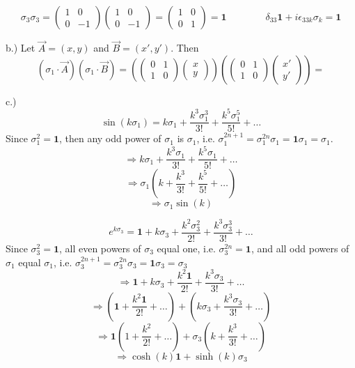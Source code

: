 \documentclass[12pt]{article}
\begin{document}
$$\sigma_3 \sigma_3 = \begin{pmatrix} 1 & 0 \\ 0 & -1 \end{pmatrix} \begin{pmatrix} 1 & 0 \\ 0 & -1 \end{pmatrix} = \begin{pmatrix} 1 & 0 \\ 0 & 1 \end{pmatrix} = \textbf{1} \qquad \qquad \delta_{33}\textbf{1} + i \epsilon_{33k} \sigma_k = \textbf{1}$$

b.) Let $\vec{A} = (x, y)$ and $\vec{B} = (x', y')$. Then
$$(\sigma_1 \cdot \vec{A})(\sigma_1 \cdot \vec{B}) =  (\begin{pmatrix} 0 & 1 \\ 1 & 0 \end{pmatrix} \begin{pmatrix} x \\ y \end{pmatrix}) (\begin{pmatrix} 0 & 1 \\ 1 & 0 \end{pmatrix} \begin{pmatrix} x' \\ y' \end{pmatrix}) = $$

c.)$$\sin(k \sigma_1) = k \sigma_1 + \frac{k^3 \sigma_1^3}{3!} + \frac{k^5 \sigma_1^5}{5!} + \dots$$
Since $\sigma_1^2 = \textbf{1}$, then any odd power of $\sigma_1$ is $\sigma_1$, i.e. $\sigma_1^{2n + 1} = \sigma_1^{2n} \sigma_1 = \textbf{1} \sigma_1 = \sigma_1$.
$$\Rightarrow k \sigma_1 + \frac{k^3 \sigma_1}{3!} + \frac{k^5 \sigma_1}{5!} + \dots$$
$$\Rightarrow \sigma_1 (k + \frac{k^3}{3!} + \frac{k^5}{5!} + \dots)$$
$$\Rightarrow \sigma_1 \sin(k)$$

$$e^{k \sigma_3} = \textbf{1} + k \sigma_3 + \frac{k^2 \sigma_3^2}{2!} + \frac{k^3 \sigma_3^3}{3!} + \dots$$
Since $\sigma_3^2 = \textbf{1}$, all even powers of $\sigma_3$ equal one, i.e. $\sigma_3^{2n} = \textbf{1}$, and all odd powers of $\sigma_1$  equal $\sigma_1$, i.e. $\sigma_3^{2n + 1} = \sigma_3^{2n} \sigma_3 = \textbf{1} \sigma_3 = \sigma_3$ 
$$\Rightarrow \textbf{1} + k \sigma_3 + \frac{k^2 \textbf{1}}{2!} + \frac{k^3 \sigma_3}{3!} + \dots$$
$$\Rightarrow (\textbf{1} + \frac{k^2 \textbf{1}}{2!} + \dots) + (k \sigma_3 + \frac{k^3 \sigma_3}{3!} + \dots)$$
$$\Rightarrow \textbf{1}(1 + \frac{k^2}{2!} + \dots) + \sigma_3(k + \frac{k^3}{3!} + \dots)$$
$$\Rightarrow \cosh(k) \textbf{1} + \sinh(k) \sigma_3$$
\end{document}
